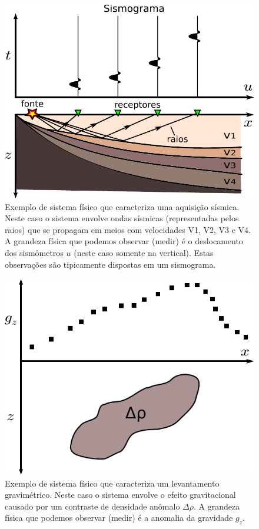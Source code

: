 \begin{figure}[b]
    \centering
    \includegraphics[scale=0.7]{figs/system-seismic}
    \caption{Exemplo de sistema físico que caracteriza uma aquisição sísmica.
        Neste caso o sistema envolve ondas sísmicas (representadas pelos raios)
        que se propagam em meios com velocidades V1, V2, V3 e V4.
        A grandeza física que podemos observar (medir)
        é o deslocamento dos sismômetros $u$ (neste caso somente na vertical).
        Estas observações são tipicamente dispostas em um sismograma.}
    \label{fig:system-seismic}
\end{figure}

\begin{figure}
    \centering
    \includegraphics[scale=0.7]{figs/system-grav}
    \caption{Exemplo de sistema físico que caracteriza um levantamento
        gravimétrico. Neste caso o sistema envolve o efeito gravitacional
        causado por um contraste de densidade anômalo $\Delta\rho$.
        A grandeza física que podemos observar (medir) é a anomalia da
        gravidade $g_z$.}
    \label{fig:system-grav}
\end{figure}

